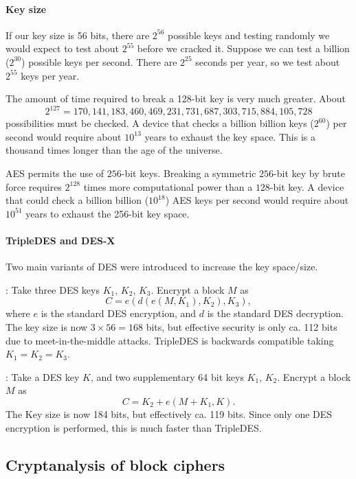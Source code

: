 \documentclass[a4paper, 11pt, openany]{book}
\begin{document}
\paragraph{Key size}
If our key size is 56 bits, there are $2^{56}$ possible keys and testing randomly we would expect to test about $2^{55}$ before we cracked it. Suppose we can test a billion ($2^{30}$) possible keys per second. There are $2^{25}$ seconds per year, so we test about $2^{55}$ keys per year.

The amount of time required to break a 128-bit key is very much greater. About
\[
    2^{127} = 170,141,183,460,469,231,731,687,303,715,884,105,728
\]
possibilities must be checked. A device that checks a billion billion keys ($2^{60}$) per second would require about $10^{13}$ years to exhaust the key space. This is a thousand times longer than the age of the universe.

AES permits the use of $256$-bit keys. Breaking a symmetric $256$-bit key by brute force requires $2^{128}$ times more computational power than a $128$-bit key. A device that could check a billion billion ($10^{18}$) AES keys per second would require about $10^{51}$ years to exhaust the 256-bit key space.





\paragraph{TripleDES and DES-X}
Two main variants of DES were introduced to increase the key space/size.

: Take three DES keys $K_1$, $K_2$, $K_3$. Encrypt a block $M$ as
\[
    C = e( d( e(M, K_1), K_2), K_3),
\]
where $e$ is the standard DES encryption, and $d$ is the standard DES decryption. The key size is now $3 \times 56 = 168$ bits, but effective security is only ca. 112 bits due to meet-in-the-middle attacks. TripleDES is backwards compatible taking $K_1 = K_2 = K_3$.

: Take a DES key $K$, and two supplementary 64 bit keys $K_1$, $K_2$. Encrypt a block $M$ as
\[
    C = K_2 + e( M + K_1, K ).
\]
The  Key size is now 184 bits, but effectively ca. 119 bits. Since only one DES encryption is performed, this is much faster than TripleDES.



\subsection{Cryptanalysis of block ciphers}
\end{document}

